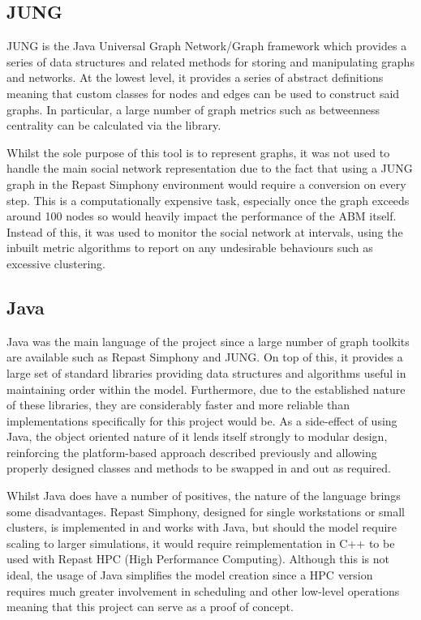 \documentclass[]{report}
\begin{document}
\subsection{JUNG}
JUNG is the Java Universal Graph Network/Graph framework which provides a series of data structures and related methods for storing and manipulating graphs and networks. At the lowest level, it provides a series of abstract definitions meaning that custom classes for nodes and edges can be used to construct said graphs. In particular, a large number of graph metrics such as betweenness centrality can be calculated via the library.

Whilst the sole purpose of this tool is to represent graphs, it was not used to handle the main social network representation due to the fact that using a JUNG graph in the Repast Simphony environment would require a conversion on every step. This is a computationally expensive task, especially once the graph exceeds around 100 nodes so would heavily impact the performance of the ABM itself. Instead of this, it was used to monitor the social network at intervals, using the inbuilt metric algorithms to report on any undesirable behaviours such as excessive clustering.

\subsection{Java}
Java was the main language of the project since a large number of graph toolkits are available such as Repast Simphony and JUNG. On top of this, it provides a large set of standard libraries providing data structures and algorithms useful in maintaining order within the model. Furthermore, due to the established nature of these libraries, they are considerably faster and more reliable than implementations specifically for this project would be. As a side-effect of using Java, the object oriented nature of it lends itself strongly to modular design, reinforcing the platform-based approach described previously and allowing properly designed classes and methods to be swapped in and out as required.

Whilst Java does have a number of positives, the nature of the language brings some disadvantages. Repast Simphony, designed for single workstations or small clusters\cite{repast-simp}, is implemented in and works with Java, but should the model require scaling to larger simulations, it would require reimplementation in C++ to be used with Repast HPC (High Performance Computing)\cite{repast-HPC}. Although this is not ideal, the usage of Java simplifies the model creation since a HPC version requires much greater involvement in scheduling and other low-level operations meaning that this project can serve as a proof of concept.
\end{document}
